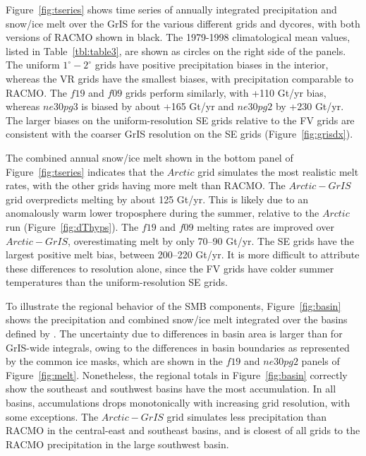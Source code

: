 \documentclass[draft]{agujournal2019}
\begin{document}
Figure~\ref{fig:tseries} shows time series of annually integrated precipitation and snow/ice melt over the GrIS for the various different grids and dycores, with both versions of RACMO shown in black. The 1979-1998 climatological mean values, listed in Table~\ref{tbl:table3}, are shown as circles on the right side of the panels. The uniform $1^{\circ}-2^{\circ}$ grids have positive precipitation biases in the interior, whereas the VR grids have the smallest biases, with precipitation comparable to RACMO. The $f19$ and $f09$ grids perform similarly, with +110 Gt/yr bias, whereas $ne30pg3$ is biased by about +165 Gt/yr and $ne30pg2$ by +230 Gt/yr. The larger biases on the uniform-resolution SE grids relative to the FV grids are consistent with the coarser GrIS resolution on the SE grids (Figure~\ref{fig:grisdx}).

The combined annual snow/ice melt shown in the bottom panel of Figure~\ref{fig:tseries} indicates that the $Arctic$ grid simulates the most realistic melt rates, with the other grids having more melt than RACMO. The $Arctic-GrIS$ grid overpredicts melting by about 125 Gt/yr. This is likely due to an anomalously warm lower troposphere during the summer, relative to the $Arctic$ run (Figure~\ref{fig:dThyps}). The $f19$ and $f09$ melting rates are improved over $Arctic-GrIS$, overestimating melt by only 70--90 Gt/yr. The SE grids have the largest positive melt bias, between 200--220 Gt/yr. It is more difficult to attribute these differences to resolution alone, since the FV grids have colder summer temperatures than the uniform-resolution SE grids.

To illustrate the regional behavior of the SMB components, Figure~\ref{fig:basin} shows the precipitation and combined snow/ice melt integrated over the basins defined by . The uncertainty due to differences in basin area is larger than for GrIS-wide integrals, owing to the differences in basin boundaries as represented by the common ice masks, which are shown in the $f19$ and $ne30pg2$ panels of Figure~\ref{fig:melt}. Nonetheless, the regional totals in Figure~\ref{fig:basin} correctly show the southeast and southwest basins have the most accumulation. In all basins, accumulations drops monotonically with increasing grid resolution, with some exceptions. The $Arctic-GrIS$ grid simulates less precipitation than RACMO in the central-east and southeast basins, and is closest of all grids to the RACMO precipitation in the large southwest basin.
\end{document}
